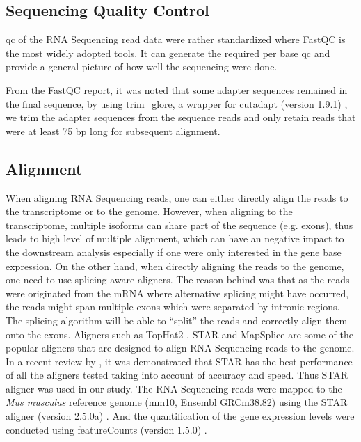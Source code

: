 \subsection{Sequencing Quality Control}
\Gls{qc} of the RNA Sequencing read data were rather standardized where FastQC \citep{Andrews2010} is the most widely adopted tools.
It can generate the required per base \gls{qc} and provide a general picture of how well the sequencing were done.

From the FastQC report, it was noted that some adapter sequences remained in the final sequence, by using trim\_glore, a wrapper for cutadapt (version 1.9.1) \citep{Martin2011}, we trim the adapter sequences from the sequence reads and only retain reads that were at least 75 \gls{bp} long for subsequent alignment. 

\subsection{Alignment}
When aligning RNA Sequencing reads, one can either directly align the reads to the transcriptome or to the genome. 
However, when aligning to the transcriptome, multiple isoforms can share part of the sequence (e.g. exons), thus leads to high level of multiple alignment, which can have an negative impact to the downstream analysis especially if one were only interested in the gene base expression.
On the other hand, when directly aligning the reads to the genome, one need to use splicing aware aligners.
The reason behind was that as the reads were originated from the mRNA where alternative splicing might have occurred, the reads might span multiple exons which were separated by intronic regions. 
The splicing algorithm will be able to ``split'' the reads and correctly align them onto the exons. 
Aligners such as TopHat2 \citep{Kim2013}, STAR \citep{Dobin2013} and MapSplice \citep{Wang2010} are some of the popular aligners that are designed to align RNA Sequencing reads to the genome.
In a recent review by \citet{Engstrom2013}, it was demonstrated that STAR has the best performance of all the aligners tested taking into account of accuracy and speed.
Thus STAR aligner was used in our study.
The RNA Sequencing reads were mapped to the \textit{Mus musculus} reference genome (mm10, Ensembl GRCm38.82) using the STAR aligner (version 2.5.0a) \citep{Dobin2013}.
And the quantification of the gene expression levels were conducted using featureCounts (version 1.5.0) \citep{Liao2014}.

